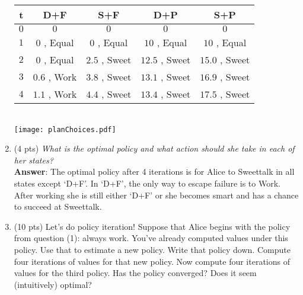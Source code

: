 \documentclass[fleqn]{hw4}
\begin{document}
\begin{enumerate}
\begin{tabular}{|c||c|c|c|c|}
\hline
{\bf t} & D+F & S+F & D+P & S+P \\
\hline
$0$ & $0$ & $0$ & $0$  & $0$  \\
\hline
$1$ & $0$ , Equal & $0$ , Equal  & $10$ , Equal  & $10$ , Equal  \\
\hline
$2$ & $0$ , Equal & $2.5$ , Sweet & $12.5$ , Sweet & $15.0$ , Sweet \\
\hline
$3$ & $0.6$ , Work & $3.8$ , Sweet & $13.1$ , Sweet & $16.9$ , Sweet \\
\hline
$4$ & $1.1$ , Work & $4.4$ , Sweet & $13.4$ , Sweet & $17.5$ , Sweet \\
\hline
\end{tabular}\\

\texttt{[image: planChoices.pdf]}  

\item(4 pts) \textit{What is the optimal policy and what action should she take in each of her states?} \\
\textbf{Answer}: The optimal policy after 4 iterations is for Alice to Sweettalk in all states except `D+F'. In `D+F', the
only way to escape failure is to Work.  After working she is still either `D+F' or she becomes smart and has a chance to 
succeed at Sweettalk.


\item(10 pts) Let's do policy iteration!  Suppose that Alice
begins with the policy from question (1): always work.  You've already
computed values under this policy.  Use that to estimate a new policy.
Write that policy down.  Compute four iterations of values for that
new policy. Now compute four iterations of values for the third policy.  Has the policy converged?
Does it seem (intuitively) optimal?

\end{enumerate}
\end{document}
